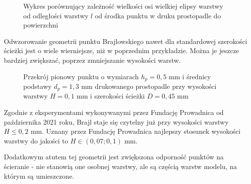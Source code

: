 \documentclass[12pt,a4paper]{article}
\begin{document}
\begin{figure}
\caption{Wykres porównujący zależność wielkości osi wielkiej elipsy warstwy od odległości warstwy $l$ od środka punktu w druku prostopadle do powierzchni}
\end{figure}

Odwzorowanie geometrii punktu Brajlowskiego nawet dla standardowej szerokości ścieżki jest o wiele wierniejsze, niż w poprzednim przykładzie. Można je jeszcze bardziej zwiększać, poprzez zmniejszanie wysokości warstw.

\begin{figure}
\caption{Przekrój pionowy punktu o wymiarach $h_p = 0{,}5 \text{ mm}$ i średnicy podstawy $d_p=1{,}3 \text{ mm}$ drukowanego prostopadle przy wysokości warstwy $H = 0{,}1 \text{ mm}$ i szerokości ścieżki $D = 0{,}45 \text{ mm}$}
\end{figure}

Zgodnie z eksperymentami wykonywanymi przez Fundację Prowadnica od października 2021 roku, Brajl staje się czytelny już przy wysokości warstwy $H \leq 0{,}2 \text{ mm}$. Uznany przez Fundację Prowadnica najlepszy stosunek wysokości warstwy do jakości to $H \in (0{,}07; 0{,}1) \text{ mm}$.

Dodatkowym atutem tej geometrii jest zwiększona odporność punktów na ścieranie - nie stanowią one osobnej warstwy, ale są częścią warstw modelu, na którym są umieszczone.
\end{document}
